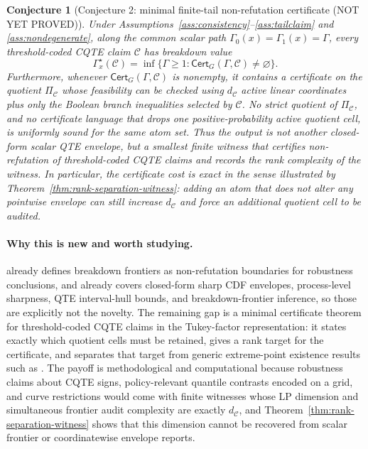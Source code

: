 \documentclass[11pt]{article}
\theoremstyle{definition}
\theoremstyle{plain}
\newtheorem{conjecture}{Conjecture}
\theoremstyle{remark}
\begin{document}
\begin{conjecture}[Conjecture 2: minimal finite-tail non-refutation certificate (NOT YET PROVED)]\label{conj:breakdown-frontier}
Under Assumptions~\ref{ass:consistency}--\ref{ass:tailclaim} and \ref{ass:nondegenerate}, along the common scalar path \(\Gamma_0(x)=\Gamma_1(x)=\Gamma\), every threshold-coded CQTE claim \(\mathcal{C}\) has breakdown value
\[
\Gamma^\star_x(\mathcal{C})=\inf\{\Gamma\ge1:\mathsf{Cert}_G(\Gamma,\mathcal{C})\ne\varnothing\}.
\]
Furthermore, whenever \(\mathsf{Cert}_G(\Gamma,\mathcal{C})\) is nonempty, it contains a certificate on the quotient \(\Pi_{\mathcal{C}}\) whose feasibility can be checked using \(d_{\mathcal{C}}\) active linear coordinates plus only the Boolean branch inequalities selected by \(\mathcal{C}\).  No strict quotient of \(\Pi_{\mathcal{C}}\), and no certificate language that drops one positive-probability active quotient cell, is uniformly sound for the same atom set.  Thus the output is not another closed-form scalar QTE envelope, but a smallest finite witness that certifies non-refutation of threshold-coded CQTE claims and records the rank complexity of the witness.  In particular, the certificate cost is exact in the sense illustrated by Theorem~\ref{thm:rank-separation-witness}: adding an atom that does not alter any pointwise envelope can still increase \(d_{\mathcal{C}}\) and force an additional quotient cell to be audited.
\end{conjecture}
\paragraph{Why this is new and worth studying.}
\citet{MastenPoirier2020} already defines breakdown frontiers as non-refutation boundaries for robustness conclusions, and \citet{Wang2026} already covers closed-form sharp CDF envelopes, process-level sharpness, QTE interval-hull bounds, and breakdown-frontier inference, so those are explicitly not the novelty.  The remaining gap is a minimal certificate theorem for threshold-coded CQTE claims in the Tukey-factor representation: it states exactly which quotient cells must be retained, gives a rank target for the certificate, and separates that target from generic extreme-point existence results such as \citet{Winkler1988}.  The payoff is methodological and computational because robustness claims about CQTE signs, policy-relevant quantile contrasts encoded on a grid, and curve restrictions would come with finite witnesses whose LP dimension and simultaneous frontier audit complexity are exactly \(d_{\mathcal{C}}\), and Theorem~\ref{thm:rank-separation-witness} shows that this dimension cannot be recovered from scalar frontier or coordinatewise envelope reports.
\end{document}
